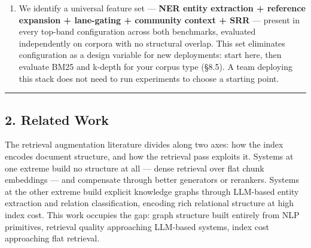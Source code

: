 \documentclass[
]{article}
\begin{document}
\begin{enumerate}
  layer in production. The result is a two-number practitioner summary:
  \textasciitilde71\% on GraphRAG-Bench (single-domain, LLM judge),
  projecting toward \textasciitilde80\% as the single-domain ceiling,
  and \textasciitilde76\% on heterogeneous cross-domain corpora (typed
  deterministic scorer). Domain composition guidance lifts effective
  per-step accuracy toward the single-domain ceiling for
  human-in-the-loop agents (§8--9).
\item
  We identify a universal feature set --- \textbf{NER entity extraction
  + reference expansion + lane-gating + community context + SRR} ---
  present in every top-band configuration across both benchmarks,
  evaluated independently on corpora with no structural overlap. This
  set eliminates configuration as a design variable for new deployments:
  start here, then evaluate BM25 and k-depth for your corpus type
  (§8.5). A team deploying this stack does not need to run experiments
  to choose a starting point.
\end{enumerate}

\begin{center}\rule{0.5\linewidth}{0.5pt}\end{center}

\subsection{2. Related Work}\label{related-work}

The retrieval augmentation literature divides along two axes: how the
index encodes document structure, and how the retrieval pass exploits
it. Systems at one extreme build no structure at all --- dense retrieval
over flat chunk embeddings --- and compensate through better generators
or rerankers. Systems at the other extreme build explicit knowledge
graphs through LLM-based entity extraction and relation classification,
encoding rich relational structure at high index cost. This work
occupies the gap: graph structure built entirely from NLP primitives,
retrieval quality approaching LLM-based systems, index cost approaching
flat retrieval.
\end{document}
